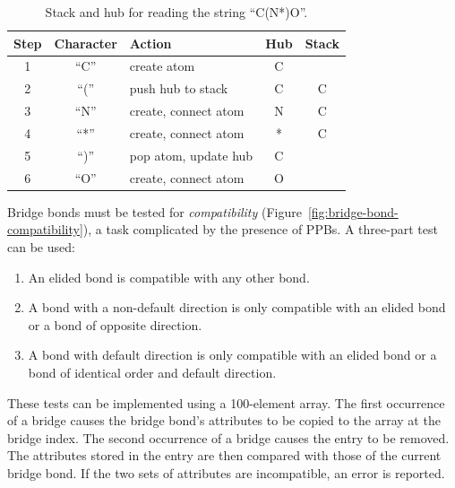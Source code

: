 \documentclass{article}
\begin{document}
\begin{table}
    \caption{Stack and hub for reading the string \enquote{C(N*)O}.}
    \centering
    \begin{tabular}{c c l c c}
        \hline
        Step & Character   & Action                          & Hub & Stack \\
        \hline
        1    & \enquote{C} & create atom                     & C   &       \\
        2    & \enquote{(} & push hub to stack               & C   &  C    \\
        3    & \enquote{N} & create, connect atom            & N   &  C    \\
        4    & \enquote{*} & create, connect atom            & *   &  C    \\
        5    & \enquote{)} & pop atom, update hub            & C   &       \\
        6    & \enquote{O} & create, connect atom            & O   &       \\
        \hline
    \end{tabular}
    \label{table:stack-for-branches}
\end{table}

Bridge bonds must be tested for \textit{compatibility} (Figure~\ref{fig:bridge-bond-compatibility}), a task complicated by the presence of PPBs. A three-part test can be used:

\begin{enumerate}
    \item An elided bond is compatible with any other bond.
    \item A bond with a non-default direction is only compatible with an elided bond or a bond of opposite direction.
    \item A bond with default direction is only compatible with an elided bond or a bond of identical order and default direction.
\end{enumerate}

These tests can be implemented using a 100-element array. The first occurrence of a bridge causes the bridge bond's attributes to be copied to the array at the bridge index. The second occurrence of a bridge causes the entry to be removed. The attributes stored in the entry are then compared with those of the current bridge bond. If the two sets of attributes are incompatible, an error is reported.
\end{document}
